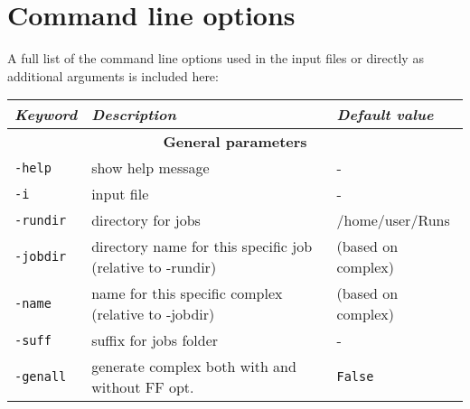 \section{Command line options}

A full list of the command line options used in the input files or directly as additional arguments is included here: \\


\centering
\small
\begin{tabular}{|l|l|l|}
\hline
\textit{\textbf{Keyword}} & \textit{\textbf{Description}} & \textit{\textbf{Default value}} \\
\hline
\multicolumn{3}{|c|}{\Large \textbf{General parameters}}\\ \hline
\texttt{-help} & show help message & - \\
\texttt{-i} & input file & - \\
\texttt{-rundir} & directory for jobs & /home/user/Runs \\
\texttt{-jobdir} & directory name for this specific job (relative to -rundir)  & (based on complex) \\
\texttt{-name} & name for this specific complex (relative to -jobdir)  & (based on complex)\footnotemark\\
\texttt{-suff} & suffix for jobs folder & - \\
\texttt{-genall} & generate complex both with and without FF opt. & \texttt{False} \\
\hline
\end{tabular}
